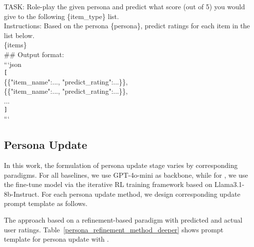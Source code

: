\begin{tcolorbox}
{\selectfont\small
TASK: Role-play the given persona and predict what score (out of 5) you would give to the following \{item\_type\} list.\\
Instructions: Based on the persona \{persona\}, predict ratings for each item in the list below.\\
\{items\}\\
\#\# Output format:\\
```json\\
\texttt{[}\\
    \{\{"item\_name":..., "predict\_rating":...\}\},\\
    \{\{"item\_name":..., "predict\_rating":...\}\},\\
    ...\\
\texttt{]}\\
```}
\end{tcolorbox}
\noindent\begin{minipage}{0.48\textwidth}
\label{persona_prediction}
\end{minipage}



\subsection{Persona Update}
In this work, the formulation of persona update stage varies by corresponding paradigms. For all baselines, we use GPT-4o-mini as backbone, while for \method, we use the fine-tune model via the iterative RL training framework based on Llama3.1-8b-Instruct. For each persona update method, we design corresponding update prompt template as follows.

\textbf{\method }
    The \method approach based on a refinement-based paradigm with predicted and actual user ratings. Table~\ref{persona_refinement_method_deeper} shows prompt template for persona update with \method.
    
